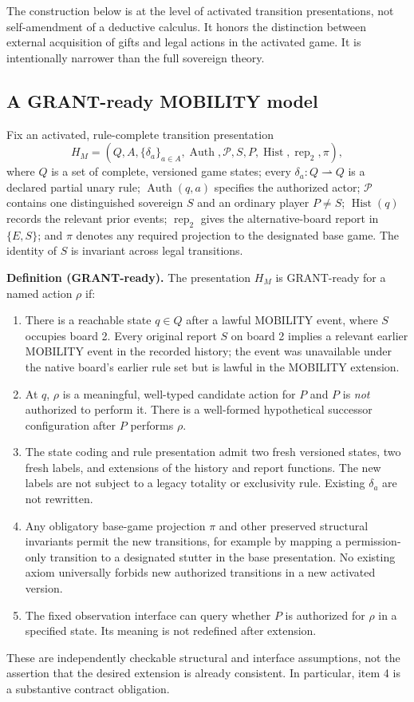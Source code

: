 \documentclass[11pt,letterpaper]{article}
\theoremstyle{definition}\newtheorem{definition}[theorem]{Definition}\newtheorem{example}[theorem]{Example}
\theoremstyle{remark}\newtheorem{remark}[theorem]{Remark}
\providecommand{\Auth}{\operatorname{Auth}}
\providecommand{\Hist}{\operatorname{Hist}}
\begin{document}
The construction below is at the level of activated transition presentations, not self-amendment of a deductive calculus. It honors the distinction between external acquisition of gifts and legal actions in the activated game. It is intentionally narrower than the full sovereign theory.

\subsection{A GRANT-ready MOBILITY model}
Fix an activated, rule-complete transition presentation
\[
H_M=(Q,A,\{\delta_a\}_{a\in A},\Auth,\mathcal P,S,P,\Hist,\operatorname{rep}_2,\pi),
\]
where $Q$ is a set of complete, versioned game states; every $\delta_a:Q\rightharpoonup Q$ is a declared partial unary rule; $\Auth(q,a)$ specifies the authorized actor; $\mathcal P$ contains one distinguished sovereign $S$ and an ordinary player $P\ne S$; $\Hist(q)$ records the relevant prior events; $\operatorname{rep}_2$ gives the alternative-board report in $\{E,S\}$; and $\pi$ denotes any required projection to the designated base game. The identity of $S$ is invariant across legal transitions.

\textbf{Definition (GRANT-ready).} The presentation $H_M$ is GRANT-ready for a named action $\rho$ if:
\begin{enumerate}
\item There is a reachable state $q\in Q$ after a lawful MOBILITY event, where $S$ occupies board 2. Every original report $S$ on board 2 implies a relevant earlier MOBILITY event in the recorded history; the event was unavailable under the native board's earlier rule set but is lawful in the MOBILITY extension.
\item At $q$, $\rho$ is a meaningful, well-typed candidate action for $P$ and $P$ is \emph{not} authorized to perform it. There is a well-formed hypothetical successor configuration after $P$ performs $\rho$.
\item The state coding and rule presentation admit two fresh versioned states, two fresh labels, and extensions of the history and report functions. The new labels are not subject to a legacy totality or exclusivity rule. Existing $\delta_a$ are not rewritten.
\item Any obligatory base-game projection $\pi$ and other preserved structural invariants permit the new transitions, for example by mapping a permission-only transition to a designated stutter in the base presentation. No existing axiom universally forbids new authorized transitions in a new activated version.
\item The fixed observation interface can query whether $P$ is authorized for $\rho$ in a specified state. Its meaning is not redefined after extension.
\end{enumerate}
These are independently checkable structural and interface assumptions, not the assertion that the desired extension is already consistent. In particular, item 4 is a substantive contract obligation.
\end{document}

